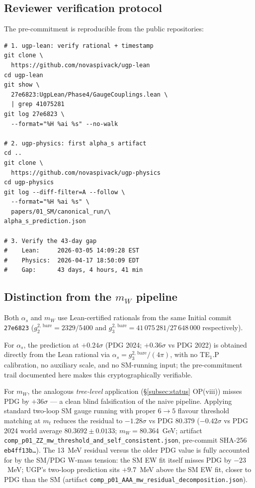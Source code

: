 \documentclass[11pt]{article}
\theoremstyle{remark}
\begin{document}
\begin{appendices}
\subsection*{Reviewer verification protocol}

The pre-commitment is reproducible from the public repositories:
{\footnotesize
\begin{verbatim}
# 1. ugp-lean: verify rational + timestamp
git clone \
  https://github.com/novaspivack/ugp-lean
cd ugp-lean
git show \
  27e6823:UgpLean/Phase4/GaugeCouplings.lean \
  | grep 41075281
git log 27e6823 \
  --format="%H %ai %s" --no-walk

# 2. ugp-physics: first alpha_s artifact
cd ..
git clone \
  https://github.com/novaspivack/ugp-physics
cd ugp-physics
git log --diff-filter=A --follow \
  --format="%H %ai %s" \
  papers/01_SM/canonical_run/\
alpha_s_prediction.json

# 3. Verify the 43-day gap
#    Lean:     2026-03-05 14:09:28 EST
#    Physics:  2026-04-17 18:50:09 EDT
#    Gap:      43 days, 4 hours, 41 min
\end{verbatim}
}

\subsection*{Distinction from the $m_W$ pipeline}
Both $\alpha_s$ and $m_W$ use Lean-certified rationals from the same Initial commit \texttt{27e6823} ($g_2^{2,\,\mathrm{bare}} = 2329/5400$ and $g_3^{2,\,\mathrm{bare}} = 41\,075\,281/27\,648\,000$ respectively).

\smallskip
For $\alpha_s$, the prediction at $+0.24\sigma$ (PDG 2024; $+0.36\sigma$ vs PDG 2022) is obtained directly from the Lean rational via $\alpha_s = g_3^{2,\,\mathrm{bare}}/(4\pi)$, with no TE$_1$.P calibration, no auxiliary scale, and no SM-running input; the pre-commitment trail documented here makes this cryptographically verifiable.

\smallskip
For $m_W$, the analogous \emph{tree-level} application (\S\ref{subsec:status} OP(viii)) misses PDG by $+36\sigma$ --- a clean blind falsification of the naive pipeline.  Applying standard two-loop SM gauge running with proper $6{\to}5$ flavour threshold matching at $m_t$ reduces the residual to $-1.28\sigma$ vs PDG 80.379 ($-0.42\sigma$ vs PDG 2024 world average $80.3692 \pm 0.0133$; $m_W = 80.364$~GeV; artifact \texttt{comp\_p01\_ZZ\_mw\_threshold\_\allowbreak and\_self\_consistent.json}, pre-commit SHA-256 \texttt{eb4ff13b\ldots}).  The 13~MeV residual versus the older PDG value is fully accounted for by the SM/PDG W-mass tension: the SM EW fit itself misses PDG by $-23$~MeV; UGP's two-loop prediction sits $+9.7$~MeV above the SM EW fit, closer to PDG than the SM (artifact \texttt{comp\_p01\_AAA\_mw\_residual\_\allowbreak decomposition.json}).


\end{appendices}
\end{document}
